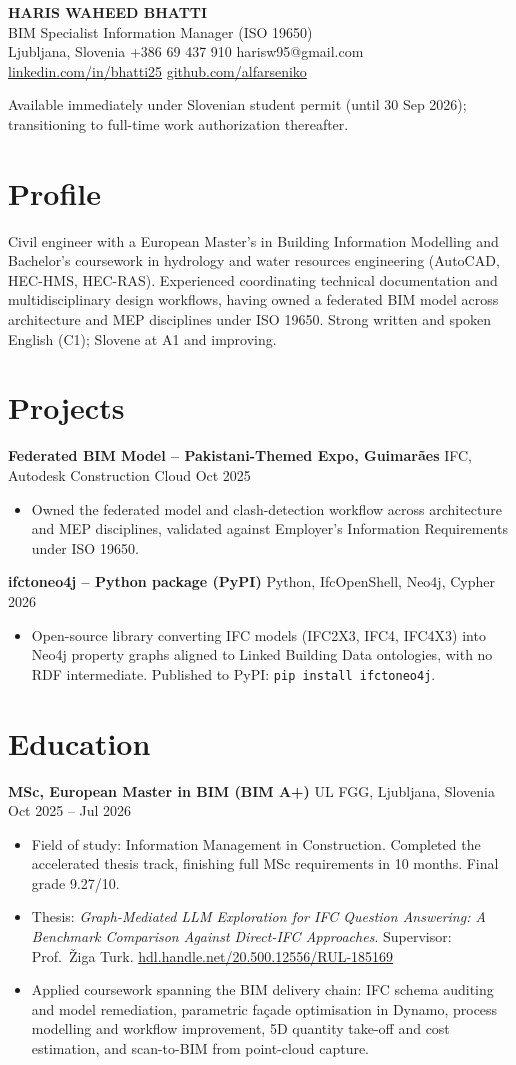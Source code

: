 \documentclass[a4paper,10.5pt]{article}
\newcommand{\datefill}{\dotfill}
\newcommand{\entry}[3]{\vspace{2.5pt}\noindent\textbf{#1} \textbar{} #2 \datefill{} #3\par\vspace{0.5pt}}
\newcommand{\ROLELINE}{BIM Specialist \textbar{} Information Manager (ISO 19650)}
\newcommand{\projIfcToNeo}{%
\entry{ifctoneo4j -- Python package (PyPI)}{Python, IfcOpenShell, Neo4j, Cypher}{2026}
\begin{itemize}
  \item Open-source library converting IFC models (IFC2X3, IFC4, IFC4X3) into Neo4j
        property graphs aligned to Linked Building Data ontologies, with no RDF
        intermediate. Published to PyPI: \texttt{pip install ifctoneo4j}.
\end{itemize}}
\newcommand{\projGuimaraes}{%
\entry{Federated BIM Model -- Pakistani-Themed Expo, Guimar\~aes}{IFC, Autodesk Construction Cloud}{Oct 2025}
\begin{itemize}
  \item Owned the federated model and clash-detection workflow across architecture
        and MEP disciplines, validated against Employer's Information Requirements
        under ISO 19650.
\end{itemize}}
\begin{document}
\begin{center}
  {\LARGE\bfseries HARIS WAHEED BHATTI}\\[2pt]
  {\large \ROLELINE}\\[3pt]
  Ljubljana, Slovenia \textbar{} +386 69 437 910 \textbar{} harisw95@gmail.com\\
  \href{https://linkedin.com/in/bhatti25}{linkedin.com/in/bhatti25} \textbar{}
  \href{https://github.com/alfarseniko}{github.com/alfarseniko}
\end{center}
\vspace{-4pt}
\noindent\small Available immediately under Slovenian student permit (until 30 Sep 2026); transitioning to full-time work authorization thereafter.\normalsize

\section{Profile}

\noindent Civil engineer with a European Master's in Building Information Modelling and
Bachelor's coursework in hydrology and water resources engineering (AutoCAD, HEC-HMS,
HEC-RAS). Experienced coordinating technical documentation and multidisciplinary
design workflows, having owned a federated BIM model across architecture and MEP
disciplines under ISO 19650. Strong written and spoken English (C1); Slovene at A1
and improving.

\section{Projects}

 \projGuimaraes \projIfcToNeo

\section{Education}
\entry{MSc, European Master in BIM (BIM A+)}{UL FGG, Ljubljana, Slovenia}{Oct 2025 -- Jul 2026}
\begin{itemize}
  \item Field of study: Information Management in Construction. Completed the
        accelerated thesis track, finishing full MSc requirements in 10 months.
        Final grade 9.27/10.
  \item Thesis: \textit{Graph-Mediated LLM Exploration for IFC Question Answering:
        A Benchmark Comparison Against Direct-IFC Approaches}. Supervisor:
        Prof.~\v{Z}iga Turk. \href{http://hdl.handle.net/20.500.12556/RUL-185169}{hdl.handle.net/20.500.12556/RUL-185169}
  \item Applied coursework spanning the BIM delivery chain: IFC schema auditing and model remediation, parametric façade optimisation in Dynamo, process modelling and workflow improvement, 5D quantity take-off and cost estimation, and scan-to-BIM from point-cloud capture.
\end{itemize}
\end{document}
